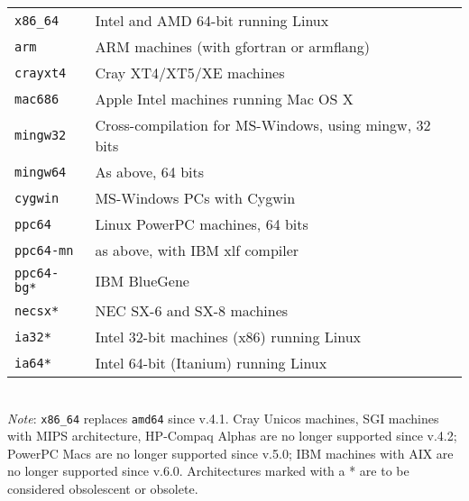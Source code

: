 \documentclass[12pt,a4paper]{article}
\begin{document}
\begin{tabular}{ll}
\texttt{x86\_64}   & Intel and AMD 64-bit running Linux\\
\texttt{arm}       & ARM machines (with gfortran or armflang)\\
\texttt{crayxt4}   & Cray XT4/XT5/XE machines\\
\texttt{mac686}    & Apple Intel machines running Mac OS X\\
\texttt{mingw32}   & Cross-compilation for MS-Windows, using mingw, 32 bits\\
\texttt{mingw64}   & As above, 64 bits\\
\texttt{cygwin}    &  MS-Windows PCs with Cygwin\\
\texttt{ppc64}     & Linux PowerPC machines, 64 bits\\
\texttt{ppc64-mn}  & as above, with IBM xlf compiler\\
\texttt{ppc64-bg*} & IBM BlueGene\\
\texttt{necsx*}    & NEC SX-6 and SX-8 machines\\
\texttt{ia32*}     & Intel 32-bit machines (x86) running Linux\\
\texttt{ia64*}     & Intel 64-bit (Itanium) running Linux
\end{tabular}\\

{\em Note}: \texttt{x86\_64} replaces \texttt{amd64} since v.4.1.
Cray Unicos machines, SGI machines with MIPS architecture, HP-Compaq Alphas
are no longer supported since v.4.2; PowerPC Macs are no longer
supported since v.5.0; IBM machines with AIX are no longer supported
since v.6.0. Architectures marked with a * are to be considered obsolescent
or obsolete.
\end{document}
